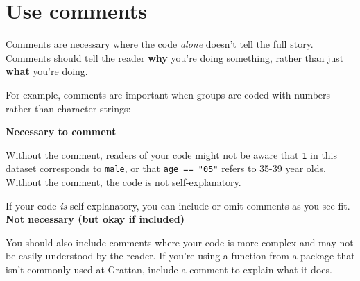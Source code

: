 \documentclass[]{book}
\newenvironment{Shaded}{\begin{snugshade}}{\end{snugshade}}
\newcommand{\CommentTok}[1]{\textcolor[rgb]{0.56,0.35,0.01}{\textit{#1}}}
\newcommand{\DecValTok}[1]{\textcolor[rgb]{0.00,0.00,0.81}{#1}}
\newcommand{\KeywordTok}[1]{\textcolor[rgb]{0.13,0.29,0.53}{\textbf{#1}}}
\newcommand{\NormalTok}[1]{#1}
\newcommand{\OperatorTok}[1]{\textcolor[rgb]{0.81,0.36,0.00}{\textbf{#1}}}
\newcommand{\StringTok}[1]{\textcolor[rgb]{0.31,0.60,0.02}{#1}}
\begin{document}
\hypertarget{use-comments}{%
\section{Use comments}\label{use-comments}}

Comments are necessary where the code \emph{alone} doesn't tell the full story. Comments should tell the reader \textbf{why} you're doing something, rather than just \textbf{what} you're doing.

For example, comments are important when groups are coded with numbers rather than character strings:

\textbf{Necessary to comment}

\begin{Shaded}
\end{Shaded}

Without the comment, readers of your code might not be aware that \texttt{1} in this dataset corresponds to \texttt{male}, or that \texttt{age\ ==\ "05"} refers to 35-39 year olds. Without the comment, the code is not self-explanatory.

If your code \emph{is} self-explanatory, you can include or omit comments as you see fit.
\textbf{Not necessary (but okay if included)}

\begin{Shaded}
\end{Shaded}

You should also include comments where your code is more complex and may not be easily understood by the reader. If you're using a function from a package that isn't commonly used at Grattan, include a comment to explain what it does.
\end{document}
